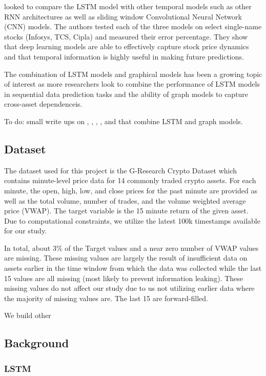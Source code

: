 \cite{Selvin2017} looked to compare the LSTM model with other temporal models such as other RNN architectures as well as sliding window Convolutional Neural Network (CNN) models. The authors tested each of the three models on select single-name stocks (Infosys, TCS, Cipla) and measured their error percentage. They show that deep learning models are able to effectively capture stock price dynamics and that temporal information is highly useful in making future predictions.

The combination of LSTM models and graphical models has been a growing topic of interest as more researchers look to combine the performance of LSTM models in sequential data prediction tasks and the ability of graph models to capture cross-asset dependenceis.

To do: small write ups on \cite{Matsunaga2019}, \cite{Feng2019}, \cite{Sun2020}, \cite{Hou2021}, and \cite{Peng2021} that combine LSTM and graph models.
 
\subsection{Dataset} \label{Dataset}

The dataset used for this project is the G-Research Crypto Dataset which contains minute-level price data for 14 commonly traded crypto assets. For each minute, the open, high, low, and close prices for the past minute are provided as well as the total volume, number of trades, and the volume weighted average price (VWAP). The target variable is the 15 minute return of the given asset. Due to computational constraints, we utilize the latest 100k timestamps available for our study.

In total, about 3\% of the Target values and a near zero number of VWAP values are missing. These missing values are largely the result of insufficient data on assets earlier in the time window from which the data was collected while the last 15 values are all missing (most likely to prevent information leaking). These missing values do not affect our study due to us not utilizing earlier data where the majority of missing values are. The last 15 are forward-filled.

We build other 

\subsection{Background} \label{Background}

\subsubsection{LSTM} \label{LSTM}

